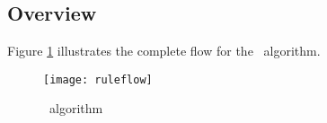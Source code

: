 \subsection{Overview}
Figure \ref{fig:algorithm_flow} illustrates the complete flow for the \algo\ algorithm.
\begin{figure}[H]
\centering
\texttt{[image: ruleflow]}
\caption{\algo\ algorithm}
\label{fig:algorithm_flow}
\end{figure}

%
